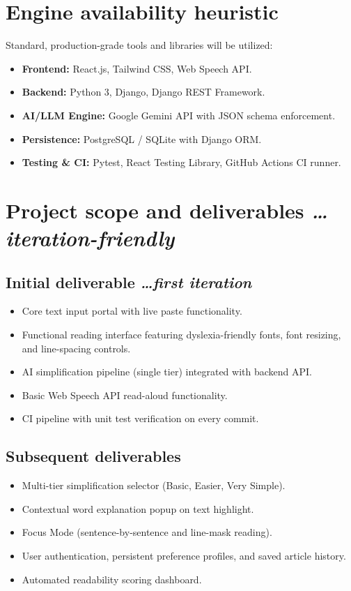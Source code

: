 \documentclass[11pt,a4paper]{article}
\newcommand{\BvrHint}[1]{%
  {\normalfont\normalsize\itshape\hfill #1}}
\begin{document}
\section{Engine availability heuristic}
Standard, production-grade tools and libraries will be utilized:
\begin{itemize}[leftmargin=0.7cm]
    \item \textbf{Frontend:} React.js, Tailwind CSS, Web Speech API.
    \item \textbf{Backend:} Python 3, Django, Django REST Framework.
    \item \textbf{AI/LLM Engine:} Google Gemini API with JSON schema enforcement.
    \item \textbf{Persistence:} PostgreSQL / SQLite with Django ORM.
    \item \textbf{Testing \& CI:} Pytest, React Testing Library, GitHub Actions CI runner.
\end{itemize}

\section{Project scope and deliverables %
\BvrHint{\ldots iteration-friendly}}
\subsection{Initial deliverable %
\BvrHint{\ldots first iteration}}
\begin{itemize}[leftmargin=0.7cm]
    \item Core text input portal with live paste functionality.
    \item Functional reading interface featuring dyslexia-friendly fonts, font resizing, and line-spacing controls.
    \item AI simplification pipeline (single tier) integrated with backend API.
    \item Basic Web Speech API read-aloud functionality.
    \item CI pipeline with unit test verification on every commit.
\end{itemize}

\subsection{Subsequent deliverables}
\begin{itemize}[leftmargin=0.7cm]
    \item Multi-tier simplification selector (Basic, Easier, Very Simple).
    \item Contextual word explanation popup on text highlight.
    \item Focus Mode (sentence-by-sentence and line-mask reading).
    \item User authentication, persistent preference profiles, and saved article history.
    \item Automated readability scoring dashboard.
\end{itemize}
\end{document}
